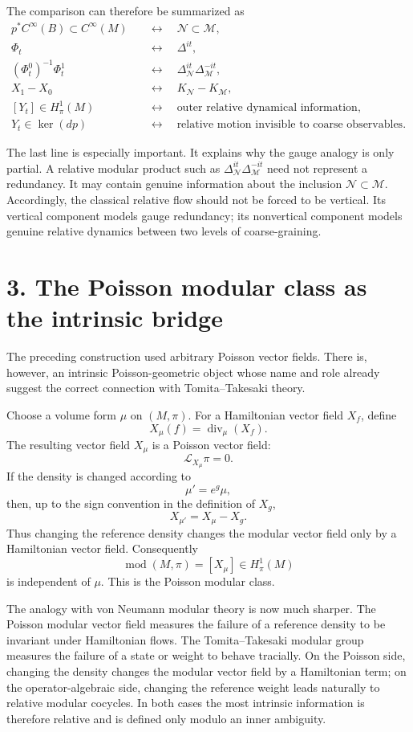 \documentclass[11pt]{article}
\newcommand{\M}{\mathcal M}
\newcommand{\N}{\mathcal N}
\newcommand{\cL}{\mathcal L}
\newcommand{\modcl}{\operatorname{mod}}
\begin{document}
The comparison can therefore be summarized as
\[
\begin{aligned}
p^*C^\infty(B)\subset C^\infty(M)
&\quad\longleftrightarrow\quad
\N\subset\M,\\[2mm]
\Phi_t
&\quad\longleftrightarrow\quad
\Delta^{it},\\[2mm]
(\Phi_t^0)^{-1}\Phi_t^1
&\quad\longleftrightarrow\quad
\Delta_\N^{it}\Delta_\M^{-it},\\[2mm]
X_1-X_0
&\quad\longleftrightarrow\quad
K_\N-K_\M,\\[2mm]
[Y_t]\in H_\pi^1(M)
&\quad\longleftrightarrow\quad
\text{outer relative dynamical information},\\[2mm]
Y_t\in\ker(dp)
&\quad\longleftrightarrow\quad
\text{relative motion invisible to coarse observables}.
\end{aligned}
\]

The last line is especially important.  It explains why the gauge analogy is
only partial.  A relative modular product such as
$\Delta_\N^{it}\Delta_\M^{-it}$ need not represent a redundancy.  It may
contain genuine information about the inclusion $\N\subset\M$.  Accordingly,
the classical relative flow should not be forced to be vertical.  Its vertical
component models gauge redundancy; its nonvertical component models genuine
relative dynamics between two levels of coarse-graining.

\section*{3. The Poisson modular class as the intrinsic bridge}

The preceding construction used arbitrary Poisson vector fields.  There is,
however, an intrinsic Poisson-geometric object whose name and role already
suggest the correct connection with Tomita--Takesaki theory.

Choose a volume form $\mu$ on $(M,\pi)$.  For a Hamiltonian vector field $X_f$,
define
\[
X_\mu(f)
=
\operatorname{div}_\mu(X_f).
\]
The resulting vector field $X_\mu$ is a Poisson vector field:
\[
\cL_{X_\mu}\pi=0.
\]
If the density is changed according to
\[
\mu'=e^g\mu,
\]
then, up to the sign convention in the definition of $X_g$,
\[
X_{\mu'}=X_\mu-X_g.
\]
Thus changing the reference density changes the modular vector field only by a
Hamiltonian vector field.  Consequently
\[
\modcl(M,\pi)
=
[X_\mu]\in H_\pi^1(M)
\]
is independent of $\mu$.  This is the Poisson modular class.

The analogy with von Neumann modular theory is now much sharper.  The Poisson
modular vector field measures the failure of a reference density to be
invariant under Hamiltonian flows.  The Tomita--Takesaki modular group measures
the failure of a state or weight to behave tracially.  On the Poisson side,
changing the density changes the modular vector field by a Hamiltonian term;
on the operator-algebraic side, changing the reference weight leads naturally
to relative modular cocycles.  In both cases the most intrinsic information is
therefore relative and is defined only modulo an inner ambiguity.
\end{document}
